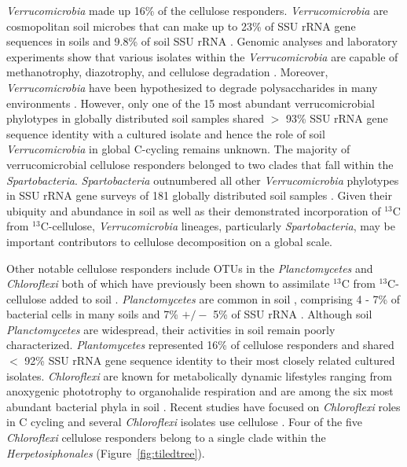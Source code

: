 \textit{Verrucomicrobia} made up 16\% of the cellulose responders.
\textit{Verrucomicrobia} are cosmopolitan soil microbes \citep{Bergmann_2011}
that can make up to 23\% of SSU rRNA gene sequences in soils
\citep{Bergmann_2011} and 9.8\% of soil SSU rRNA \citep{Buckley_2001}. Genomic
analyses and laboratory experiments show that various isolates
within the \textit{Verrucomicrobia} are capable of methanotrophy, diazotrophy,
and cellulose degradation \citep{Wertz_2011,Otsuka_2012}. Moreover,
\textit{Verrucomicrobia} have been hypothesized to degrade polysaccharides in
many environments \citep{Fierer_2013,10543821,Herlemann_2013}. However, only
one of the 15 most abundant verrucomicrobial phylotypes in globally distributed
soil samples shared $>$ 93\% SSU rRNA gene sequence identity with a cultured
isolate \citep{Bergmann_2011} and hence the role of soil
\textit{Verrucomicrobia} in global C-cycling remains unknown. The majority of
verrucomicrobial cellulose responders belonged to two clades that fall within
the \textit{Spartobacteria}. \textit{Spartobacteria} outnumbered all other
\textit{Verrucomicrobia} phylotypes in SSU rRNA gene surveys of
181 globally distributed soil samples \citep{Bergmann_2011}. Given their ubiquity and abundance
in soil as well as their demonstrated incorporation of $^{13}$C from
$^{13}$C-cellulose, \textit{Verrucomicrobia} lineages, particularly
\textit{Spartobacteria}, may be important contributors to cellulose
decomposition on a global scale. 

Other notable cellulose responders include OTUs in the \textit{Planctomycetes}
and \textit{Chloroflexi} both of which have previously been shown to
assimilate $^{13}$C from $^{13}$C-cellulose added to soil
\citep{Schellenberger_2010}. \textit{Planctomycetes} are common in soil
\citep{Janssen2006}, comprising 4 - 7\% of bacterial cells in many soils
\citep{Zarda_1997,Chatzinotas_1998} and 7\% $+/-$ 5\% of SSU rRNA
\citep{buckley_2003}. Although soil \textit{Planctomycetes} are widespread,
their activities in soil remain poorly characterized. \textit{Plantomycetes}
represented 16\% of cellulose responders and shared $<$ 92\% SSU rRNA gene
sequence identity to their most closely related cultured isolates.
\textit{Chloroflexi} are known for metabolically dynamic lifestyles ranging
from anoxygenic phototrophy to organohalide respiration \citep{Hug_2013} and
are among the six most abundant bacterial phyla in soil \citep{Janssen2006}.
Recent studies have focused on \textit{Chloroflexi} roles in C cycling
\citep{Hug_2013,Goldfarb_2011,Cole_2013} and several \textit{Chloroflexi}
isolates use cellulose \citep{Hug_2013,Goldfarb_2011,Cole_2013}. Four
of the five \textit{Chloroflexi} cellulose responders belong to a single clade
within the \textit{Herpetosiphonales} (Figure~\ref{fig:tiledtree}). 

